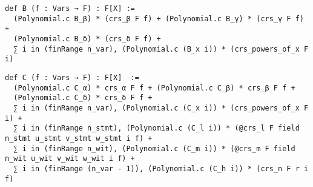 \documentclass{article}
\theoremstyle{definition}
\theoremstyle{remark}
\begin{document}
\begin{lstlisting}
def B (f : Vars → F) : F[X] :=
  (Polynomial.c B_β) * (crs_β F f) + (Polynomial.c B_γ) * (crs_γ F f) +
  (Polynomial.c B_δ) * (crs_δ F f) +
  ∑ i in (finRange n_var), (Polynomial.c (B_x i)) * (crs_powers_of_x F i)
\end{lstlisting}

\begin{lstlisting}
def C (f : Vars → F) : F[X]  :=
  (Polynomial.c C_α) * crs_α F f + (Polynomial.c C_β) * crs_β F f +
  (Polynomial.c C_δ) * crs_δ F f +
  ∑ i in (finRange n_var), (Polynomial.c (C_x i)) * (crs_powers_of_x F i) +
  ∑ i in (finRange n_stmt), (Polynomial.c (C_l i)) * (@crs_l F field n_stmt u_stmt v_stmt w_stmt i f) +
  ∑ i in (finRange n_wit), (Polynomial.c (C_m i)) * (@crs_m F field n_wit u_wit v_wit w_wit i f) +
  ∑ i in (finRange (n_var - 1)), (Polynomial.c (C_h i)) * (crs_n F r i f)
\end{lstlisting}



\end{document}
